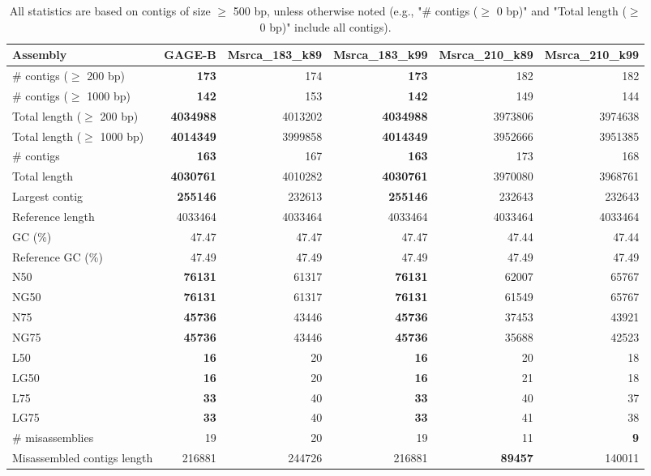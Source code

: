 \documentclass[12pt,a4paper]{article}
\begin{document}
\begin{table}[ht]
\begin{center}
\caption{All statistics are based on contigs of size $\geq$ 500 bp, unless otherwise noted (e.g., "\# contigs ($\geq$ 0 bp)" and "Total length ($\geq$ 0 bp)" include all contigs).}
\begin{tabular}{|l*{5}{|r}|}
\hline
Assembly & GAGE-B & Msrca\_183\_k89 & Msrca\_183\_k99 & Msrca\_210\_k89 & Msrca\_210\_k99 \\ \hline
\# contigs ($\geq$ 200 bp) & {\bf 173} & 174 & {\bf 173} & 182 & 182 \\ \hline
\# contigs ($\geq$ 1000 bp) & {\bf 142} & 153 & {\bf 142} & 149 & 144 \\ \hline
Total length ($\geq$ 200 bp) & {\bf 4034988} & 4013202 & {\bf 4034988} & 3973806 & 3974638 \\ \hline
Total length ($\geq$ 1000 bp) & {\bf 4014349} & 3999858 & {\bf 4014349} & 3952666 & 3951385 \\ \hline
\# contigs & {\bf 163} & 167 & {\bf 163} & 173 & 168 \\ \hline
Total length & {\bf 4030761} & 4010282 & {\bf 4030761} & 3970080 & 3968761 \\ \hline
Largest contig & {\bf 255146} & 232613 & {\bf 255146} & 232643 & 232643 \\ \hline
Reference length & 4033464 & 4033464 & 4033464 & 4033464 & 4033464 \\ \hline
GC (\%) & 47.47 & 47.47 & 47.47 & 47.44 & 47.44 \\ \hline
Reference GC (\%) & 47.49 & 47.49 & 47.49 & 47.49 & 47.49 \\ \hline
N50 & {\bf 76131} & 61317 & {\bf 76131} & 62007 & 65767 \\ \hline
NG50 & {\bf 76131} & 61317 & {\bf 76131} & 61549 & 65767 \\ \hline
N75 & {\bf 45736} & 43446 & {\bf 45736} & 37453 & 43921 \\ \hline
NG75 & {\bf 45736} & 43446 & {\bf 45736} & 35688 & 42523 \\ \hline
L50 & {\bf 16} & 20 & {\bf 16} & 20 & 18 \\ \hline
LG50 & {\bf 16} & 20 & {\bf 16} & 21 & 18 \\ \hline
L75 & {\bf 33} & 40 & {\bf 33} & 40 & 37 \\ \hline
LG75 & {\bf 33} & 40 & {\bf 33} & 41 & 38 \\ \hline
\# misassemblies & 19 & 20 & 19 & 11 & {\bf 9} \\ \hline
Misassembled contigs length & 216881 & 244726 & 216881 & {\bf 89457} & 140011 \\ \hline

\end{tabular}
\end{center}
\end{table}
\end{document}

